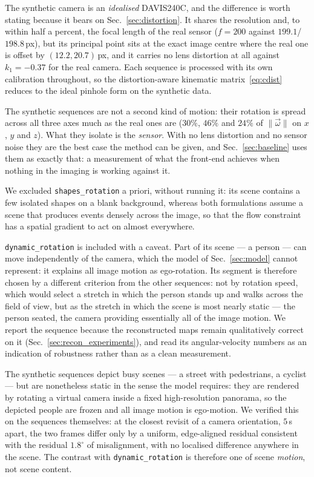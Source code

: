 \documentclass[journal]{IEEEtran}
\newcommand{\wvec}{\vec{\omega}}
\begin{document}
The synthetic camera is an \emph{idealised} DAVIS240C, and the difference is
worth stating because it bears on Sec.~\ref{sec:distortion}. It shares the
resolution and, to within half a percent, the focal length of the real sensor
($f = 200$ against $199.1$/$198.8$\,px), but its principal point sits at the
exact image centre where the real one is offset by $(12.2, 20.7)$\,px, and it
carries no lens distortion at all against $k_1 = -0.37$ for the real camera.
Each sequence is processed with its own calibration throughout, so the
distortion-aware kinematic matrix~\eqref{eq:cdist} reduces to the ideal pinhole
form on the synthetic data.

The synthetic sequences are not a second kind of motion: their rotation is
spread across all three axes much as the real ones are ($30\%$, $46\%$ and
$24\%$ of $\lVert\wvec\rVert$ on $x$, $y$ and $z$). What they isolate is the
\emph{sensor}. With no lens distortion and no sensor noise they are the
best case the method can be given, and Sec.~\ref{sec:baseline} uses them as
exactly that: a measurement of what the front-end achieves when nothing in the
imaging is working against it.

We excluded \texttt{shapes\_rotation} a priori, without running it: its scene
contains a few isolated shapes on a blank background, whereas both formulations
assume a scene that produces events densely across the image, so that the flow
constraint has a spatial gradient to act on almost everywhere.

\texttt{dynamic\_rotation} is included with a caveat. Part of its scene --- a
person --- can move independently of the camera, which the model of
Sec.~\ref{sec:model} cannot represent: it explains all image motion as
ego-rotation. Its segment is therefore chosen by a different criterion from the
other sequences: not by rotation speed, which would select a stretch in which
the person stands up and walks across the field of view, but as the stretch in
which the scene is most nearly static --- the person seated, the camera
providing essentially all of the image motion. We report the sequence because
the reconstructed maps remain qualitatively correct on it
(Sec.~\ref{sec:recon_experiments}), and read its angular-velocity numbers as an
indication of robustness rather than as a clean measurement.

The synthetic sequences depict busy scenes --- a street with pedestrians, a
cyclist --- but are nonetheless static in the sense the model requires: they are
rendered by rotating a virtual camera inside a fixed high-resolution panorama,
so the depicted people are frozen and all image motion is ego-motion. We
verified this on the sequences themselves: at the closest revisit of a camera
orientation, $5$\,s apart, the two frames differ only by a uniform,
edge-aligned residual consistent with the residual $1.8^\circ$ of
misalignment, with no localised difference anywhere in the scene. The contrast
with \texttt{dynamic\_rotation} is therefore one of scene \emph{motion}, not
scene content.
\end{document}
